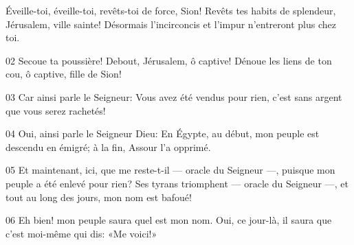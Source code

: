Éveille-toi, éveille-toi, revêts-toi de force, Sion! Revêts tes habits de splendeur, Jérusalem, ville sainte! Désormais l’incirconcis et l’impur n’entreront plus chez toi.

02 Secoue ta poussière! Debout, Jérusalem, ô captive! Dénoue les liens de ton cou, ô captive, fille de Sion!

03 Car ainsi parle le Seigneur: Vous avez été vendus pour rien, c’est sans argent que vous serez rachetés!

04 Oui, ainsi parle le Seigneur Dieu: En Égypte, au début, mon peuple est descendu en émigré; à la fin, Assour l’a opprimé.

05 Et maintenant, ici, que me reste-t-il --- oracle du Seigneur ---, puisque mon peuple a été enlevé pour rien? Ses tyrans triomphent --- oracle du Seigneur ---, et tout au long des jours, mon nom est bafoué!

06 Eh bien! mon peuple saura quel est mon nom. Oui, ce jour-là, il saura que c’est moi-même qui dis: «Me voici!»